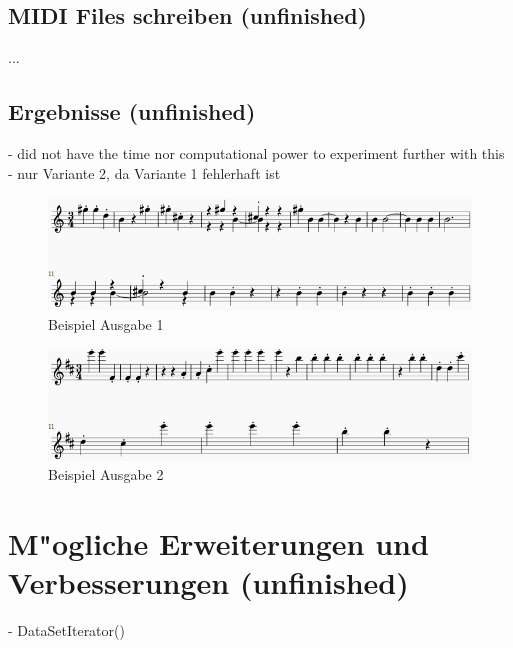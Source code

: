 {\subsection{MIDI Files schreiben (unfinished)}
...

\subsection{Ergebnisse (unfinished)}
- did not have the time nor computational power to experiment further with this
- nur Variante 2, da Variante 1 fehlerhaft ist

\renewcommand{\figurename}{Abb.}
\begin{figure}[htp]
\centering
\includegraphics[width=1\textwidth]{pictures/sampleMidi1.png}
\caption[Beispiel Ausgabe 1]{Beispiel Ausgabe 1}
\end{figure}

\renewcommand{\figurename}{Abb.}
\begin{figure}[htp]
\centering
\includegraphics[width=1\textwidth]{pictures/sampleMidi2.png}
\caption[Beispiel Ausgabe 2]{Beispiel Ausgabe 2}
\end{figure}

\section{M"ogliche Erweiterungen und Verbesserungen (unfinished)}
- DataSetIterator()
} %